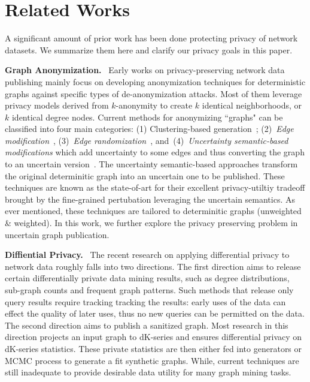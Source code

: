 \section{Related Works}
A significant amount of prior work has been done protecting privacy of network datasets.
We summarize them here and clarify our privacy goals in this paper. 

\textbf{Graph Anonymization.}~ Early works on privacy-preserving network data publishing mainly focus on developing anonymization techniques for deterministic graphs against specific types of de-anonymization attacks. Most of them leverage privacy models derived from $k$-anonymity to create $k$ identical neighborhoods, or $k$ identical degree nodes. Current methods for anonymizing ``graphs" can be classified into four main categories: (1) Clustering-based generation~\cite{Hay_Anonymizing_2007,Bhagat_Class_2009,hay2010resisting}; (2)~{\em Edge modification}~\cite{Liu_Towards_2008, Zhou_Preserving_2008, Wang2011, Wu_k_2010, Skarkala_Privacy_2012}, 
(3)~{\em Edge randomization}~\cite{Liu_Privacy_2009,Ying_Randomizing_2008, Ninggal_Utility_2015},
and~(4)~{\em Uncertainty semantic-based modifications} which add uncertainty to some edges and thus converting the graph to an uncertain version~\cite{Boldi_Injecting_2012, Nguyen_Anonymizing_2015}. 
The uncertainty semantic-based approaches transform the original determinitic graph into an uncertain one to be published. These techniques are known as the state-of-art for their excellent privacy-utiltiy tradeoff brought by the fine-grained pertubation leveraging the uncertain semantics. As ever mentioned, these techniques are tailored to determinitic graphs (unweighted \& weighted). In this work, we further explore the privacy preserving problem in uncertain graph publication. 


\textbf{Diffiential Privacy.}~ The recent research on applying differential privacy to network data roughly falls into two directions. The first direction aims to release certain differentially private data mining results, such as degree distributions, sub-graph counts and frequent graph patterns. Such methods that release only query results require tracking tracking the results: early uses of the data can effect the quality of later uses, thus no new queries can be permitted on the data.  
The second direction aims to publish a sanitized graph. Most research in this direction projects an input graph to dK-series and ensures differential privacy on dK-series statistics. These private statistics are then either fed into generators or MCMC process to generate a fit synthetic graphs. While, current techniques are still inadequate to provide desirable data utility for many graph mining tasks. 



